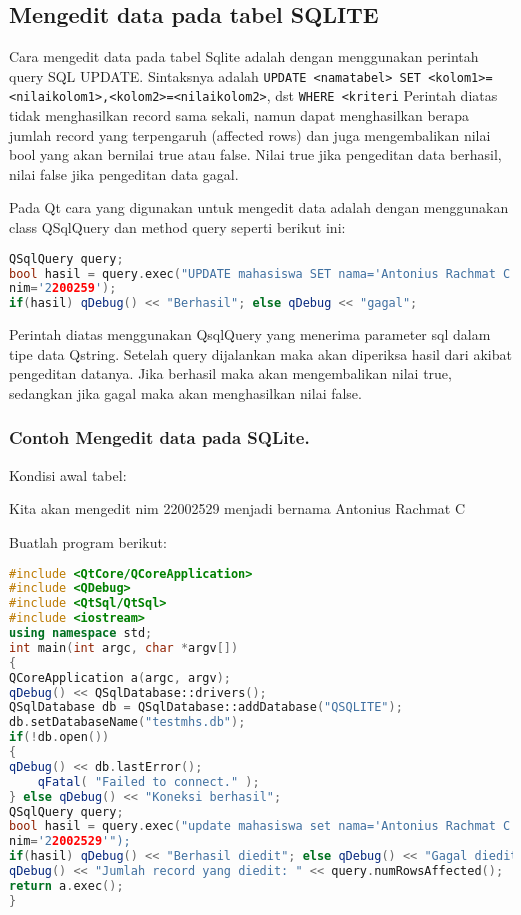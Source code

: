 \subsection{Mengedit data pada tabel
SQLITE}\label{mengedit-data-pada-tabel-sqlite}

Cara mengedit data pada tabel Sqlite adalah dengan menggunakan perintah
query SQL UPDATE. Sintaksnya adalah
\texttt{UPDATE\ \textless{}namatabel\textgreater{}\ SET\ \textless{}kolom1\textgreater{}=\textless{}nilaikolom1\textgreater{},\textless{}kolom2\textgreater{}=\textless{}nilaikolom2\textgreater{}},
dst \texttt{WHERE\ \textless{}kriteri} Perintah diatas tidak
menghasilkan record sama sekali, namun dapat menghasilkan berapa jumlah
record yang terpengaruh (affected rows) dan juga mengembalikan nilai
bool yang akan bernilai true atau false. Nilai true jika pengeditan data
berhasil, nilai false jika pengeditan data gagal.

Pada Qt cara yang digunakan untuk mengedit data adalah dengan
menggunakan class QSqlQuery dan method query seperti berikut ini:

\begin{lstlisting}[language=c++, caption=menggunakan class QSqlQuery dan method query]
QSqlQuery query;
bool hasil = query.exec("UPDATE mahasiswa SET nama='Antonius Rachmat C' WHERE
nim='2200259');
if(hasil) qDebug() << "Berhasil"; else qDebug << "gagal";
\end{lstlisting}

Perintah diatas menggunakan QsqlQuery yang menerima parameter sql dalam
tipe data Qstring. Setelah query dijalankan maka akan diperiksa hasil
dari akibat pengeditan datanya. Jika berhasil maka akan mengembalikan
nilai true, sedangkan jika gagal maka akan menghasilkan nilai false.

\subsubsection*{Contoh Mengedit data pada SQLite.}

Kondisi awal tabel:

Kita akan mengedit nim 22002529 menjadi bernama Antonius Rachmat C

Buatlah program berikut:

\begin{lstlisting}[language=c++, caption=Mengedit data pada SQLite]
#include <QtCore/QCoreApplication>
#include <QDebug>
#include <QtSql/QtSql>
#include <iostream>
using namespace std;
int main(int argc, char *argv[])
{
QCoreApplication a(argc, argv);
qDebug() << QSqlDatabase::drivers();
QSqlDatabase db = QSqlDatabase::addDatabase("QSQLITE");
db.setDatabaseName("testmhs.db");
if(!db.open())
{
qDebug() << db.lastError();
    qFatal( "Failed to connect." );
} else qDebug() << "Koneksi berhasil";
QSqlQuery query;
bool hasil = query.exec("update mahasiswa set nama='Antonius Rachmat C' where
nim='22002529'");
if(hasil) qDebug() << "Berhasil diedit"; else qDebug() << "Gagal diedit";
qDebug() << "Jumlah record yang diedit: " << query.numRowsAffected();
return a.exec();
}
\end{lstlisting}

